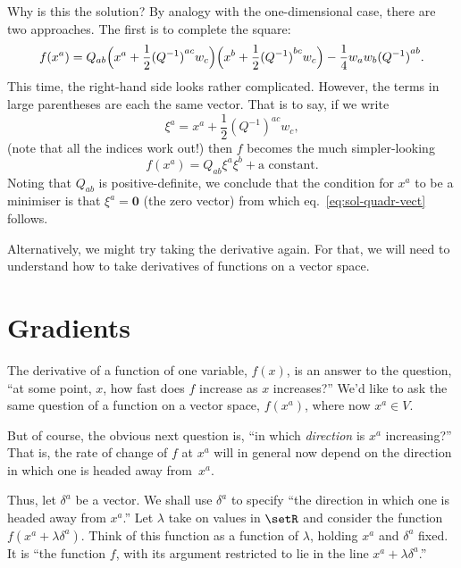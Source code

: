 \documentclass[10pt, a4paper]{article}
\newcommand{\bzero}{\mathbold{0}} %
\begin{document}
Why is this the solution? By analogy with the one-dimensional case,
there are two approaches. The first is to complete the square:
\begin{equation*}
  f(x^a) = Q_{ab}\Bigl(x^a +
  \frac{1}{2}{(Q^{-1})}^{ac}w_c\Bigr)\Bigl(x^b +
  \frac{1}{2}{(Q^{-1})}^{bc}w_c\Bigr) - \frac{1}{4}w_aw_b{(Q^{-1})}^{ab}.
\end{equation*}
This time, the right-hand side looks rather complicated. However, the
terms in large parentheses are each the same vector. That is to say,
if we write
\begin{equation*}
  \xi^a = x^a +  \frac{1}{2}{(Q^{-1})}^{ac}w_c,
\end{equation*}
(note that all the indices work out!) then $f$ becomes the much
simpler-looking
\begin{equation*}
  f(x^a) = Q_{ab}\xi^a\xi^b + \text{a constant}.
\end{equation*}
Noting that $Q_{ab}$ is positive-definite, we conclude that the
condition for $x^a$ to be a minimiser is that $\xi^a = \bzero$ (the zero
vector) from which eq.~\ref{eq:sol-quadr-vect} follows.

Alternatively, we might try taking the derivative again. For that, we
will need to understand how to take derivatives of functions on a
vector space.

\section*{Gradients}

The derivative of a function of one variable, $f(x)$, is an answer to
the question, “at some point, $x$, how fast does $f$ increase as $x$
increases?” We'd like to ask the same question of a function on a
vector space, $f(x^a)$, where now $x^a\in V$.

But of course, the obvious next question is, “in which
\emph{direction} is $x^a$ increasing?” That is, the rate of change of
$f$ at $x^a$ will in general now depend on the direction in which one
is headed away from~$x^a$.

Thus, let $\delta^a$ be a vector. We shall use $\delta^a$ to specify “the
direction in which one is headed away from $x^a$.” Let $\lambda$ take on values in
$\setR$ and consider the function $f(x^a+\lambda\delta^a)$. Think of this
function as a function of $\lambda$, holding $x^a$ and $\delta^a$ fixed. It
is “the function $f$, with its argument restricted to lie in the line
$x^a+\lambda\delta^a$.”
\end{document}
